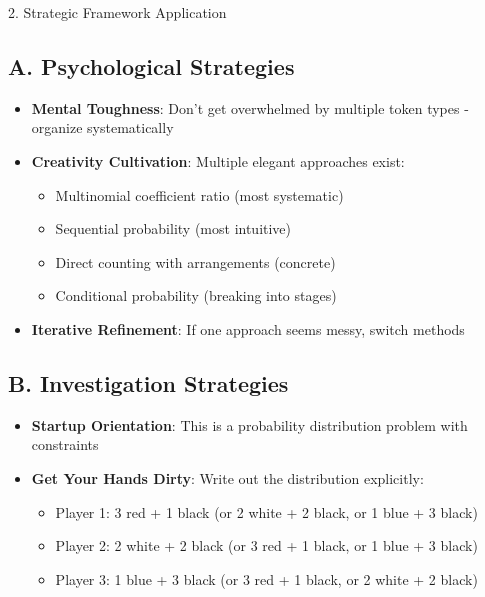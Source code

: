 \documentclass[12pt]{article}
\begin{document}
\begin{strategybox}{2. Strategic Framework Application}

\subsection*{A. Psychological Strategies}
\begin{itemize}[leftmargin=*]
    \item \textbf{Mental Toughness}: Don't get overwhelmed by multiple token types - organize systematically
    
    \item \textbf{Creativity Cultivation}: Multiple elegant approaches exist:
    \begin{itemize}
        \item Multinomial coefficient ratio (most systematic)
        \item Sequential probability (most intuitive)
        \item Direct counting with arrangements (concrete)
        \item Conditional probability (breaking into stages)
    \end{itemize}
    
    \item \textbf{Iterative Refinement}: If one approach seems messy, switch methods
\end{itemize}

\subsection*{B. Investigation Strategies}
\begin{itemize}[leftmargin=*]
    \item \textbf{Startup Orientation}: This is a probability distribution problem with constraints
    
    \item \textbf{Get Your Hands Dirty}: Write out the distribution explicitly:
    \begin{itemize}
        \item Player 1: 3 red + 1 black (or 2 white + 2 black, or 1 blue + 3 black)
        \item Player 2: 2 white + 2 black (or 3 red + 1 black, or 1 blue + 3 black)
        \item Player 3: 1 blue + 3 black (or 3 red + 1 black, or 2 white + 2 black)
    \end{itemize}
    

\end{itemize}
\end{strategybox}
\end{document}
